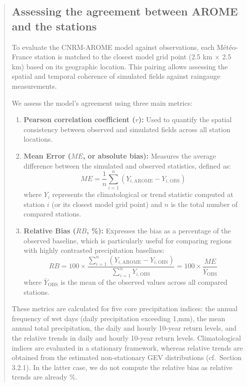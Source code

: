 \documentclass[
  letterpaper,
  DIV=11,
  numbers=noendperiod]{scrartcl}
\begin{document}
\begin{quote}
\subsection{Assessing the agreement between AROME and the stations}\label{assessing}

To evaluate the CNRM-AROME model against observations, each Météo-France
station is matched to the closest model grid point (2.5 km \(\times\)
2.5 km) based on its geographic location. This pairing allows assessing
the spatial and temporal coherence of simulated fields against raingauge
measurements.

We assess the model's agreement using three main metrics:

\begin{enumerate}
    \item \textbf{Pearson correlation coefficient ($r$):} Used to quantify the spatial consistency between observed and simulated fields across all station locations.
    \item \textbf{Mean Error ($ME$, or absolute bias):} Measures the average difference between the simulated and observed statistics, defined as:
    \begin{equation}
        ME = \frac{1}{n}\sum_{i=1}^{n} (Y_{i,\text{AROME}} - Y_{i,\text{OBS}})
    \end{equation}
    where $Y_i$ represents the climatological or trend statistic computed at station $i$ (or its closest model grid point) and $n$ is the total number of compared stations.
    \item \textbf{Relative Bias ($RB$, \%):} Expresses the bias as a percentage of the observed baseline, which is particularly useful for comparing regions with highly contrasted precipitation baselines:
    \begin{equation}
        RB = 100 \times \frac{\sum_{i=1}^{n} (Y_{i,\text{AROME}} - Y_{i,\text{OBS}})}{\sum_{i=1}^{n} Y_{i,\text{OBS}}} = 100 \times \frac{ME}{\bar{Y}_{\text{OBS}}}
    \end{equation}
    where $\bar{Y}_{\text{OBS}}$ is the mean of the observed values across all compared stations.
\end{enumerate}

These metrics are calculated for five core precipitation indices: the
annual frequency of wet days (daily precipitation exceeding 1,mm), the
mean annual total precipitation, the daily and hourly 10-year return
levels, and the relative trends in daily and hourly 10-year return
levels. Climatological indices are evaluated in a stationary framework,
whereas relative trends are obtained from the estimated non-stationary
GEV distributions (cf.~Section 3.2.1). In the latter case, we do not
compute the relative bias as relative trends are already \%.
\end{quote}
\end{document}
